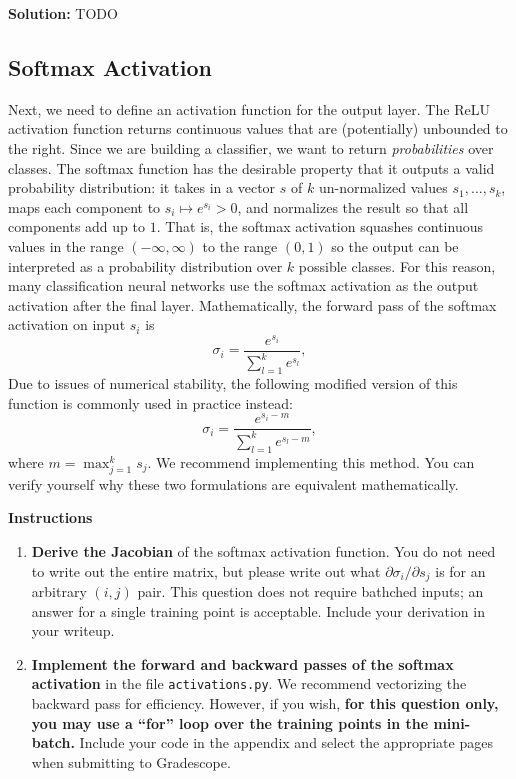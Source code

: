 \documentclass{article}
\newenvironment{solution}{\color{blue} \smallskip \textbf{Solution:}}{}
\begin{document}
\begin{solution}
    TODO
\end{solution}

\newpage
\subsection{Softmax Activation}
Next, we need to define an activation function for the output layer. 
The ReLU activation function returns continuous values that are (potentially) unbounded to the right. 
Since we are building a classifier, we want to return \textit{probabilities} over classes. 
The softmax function has the desirable property that it outputs a valid probability distribution: it takes in a vector $s$ of $k$ un-normalized values $s_1, \ldots, s_k$, maps each component to $s_i \mapsto e^{s_i} > 0$, and normalizes the result so that all components add up to $1$. 
That is, the softmax activation squashes continuous values in the range $(-\infty, \infty)$ to the range $(0, 1)$ so the output can be interpreted as a probability distribution over $k$ possible classes. 
For this reason, many classification neural networks use the softmax activation as the output activation after the final layer. 
Mathematically, the forward pass of the softmax activation on input $s_i$ is 
\[
    \sigma_i = \frac{e^{s_i}}{\sum_{l=1}^{k} e^{s_l}},
\]
Due to issues of numerical stability, the following modified version of this function is commonly used in practice instead:
\[
    \sigma_i = \frac{e^{s_i - m}}{\sum_{l=1}^{k} e^{s_l-m}},
\]
where $m = \max_{j=1}^k s_j$. 
We recommend implementing this method. 
You can verify yourself why these two formulations are equivalent mathematically.

\textbf{Instructions}
\begin{enumerate}
    \item 
    \textbf{Derive the Jacobian} of the softmax activation function. 
    You do not need to write out the entire matrix, but please write out what $\partial \sigma_i/\partial s_j$ is for an arbitrary $(i, j)$ pair. 
    This question does not require bathched inputs; an answer for a single training point is acceptable. 
    Include your derivation in your writeup.

    \item 
    \textbf{Implement the forward and backward passes of the softmax activation} in the file \texttt{activations.py}. 
    We recommend vectorizing the backward pass for efficiency. 
    However, if you wish, \textbf{for this question only, you may use a ``for'' loop over the training points in the mini-batch.} 
    Include your code in the appendix and select the appropriate pages when submitting to Gradescope.
\end{enumerate}
\end{document}
